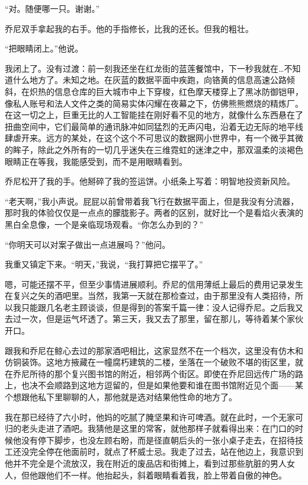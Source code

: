 \documentclass[AutoFakeBold=true]{book}
\begin{document}
``对。随便哪一只。谢谢。''

乔尼双手拿起我的右手。他的手指修长，比我的还长。但我的粗壮。

``把眼睛闭上。''他说。

我闭上了。没有过渡：前一刻我还坐在红龙街的蓝莲餐馆中，下一秒我就在…不知道什么地方了。未知之地。在灰蓝的数据平面中疾跑，向铬黄的信息高速公路倾斜，在炽热的信息仓库的巨大城市中上下穿梭，红色摩天楼穿上了黑冰防御铠甲，像私人账号和法人文件之类的简易实体闪耀在夜幕之下，仿佛熊熊燃烧的精炼厂。在这一切之上，巨重无比的人工智能挂在刚好看不见的地方，就像什么东西悬在了扭曲空间中，它们最简单的通讯脉冲如同猛烈的无声闪电，沿着无边无际的地平线肆虐开来。远方的某处，在这个这个不可思议的数据网小世界中，有一个微乎其微的眸子，除此之外所有的一切几乎迷失在三维霓虹的迷津之中，那双温柔的淡褐色眼睛正在等我，我能感受到，而不是用眼睛看到。

乔尼松开了我的手。他掰碎了我的签运饼。小纸条上写着：明智地投资新风险。

``老天啊，''我小声说。屁屁以前曾带着我飞行在数据平面上，但是我没有分流器，那时我的体验仅仅是一点点的朦胧影子。两者的区别，就好比一个是看焰火表演的黑白全息像，一个是亲临现场观看。``你怎么办到的？''

``你明天可以对案子做出一点进展吗？''他问。

我重又镇定下来。``明天，''我说，``我打算把它摆平了。''

\vspace*{1em}

嗯，可能还摆不平，但至少事情进展顺利。乔尼的信用薄纸上最后的费用记录发生在复兴之矢的酒吧里。当然，我第一天就在那检查过，由于那里没有人类招待，所以我只能跟几名老主顾谈谈，但是得到的答案千篇一律：没人记得乔尼。之后我又去过一次，但是运气坏透了。第三天，我又去了那里，留在那儿，等待着某个家伙开口。

跟我和乔尼在鲸心去过的那家酒吧相比，这家显然不在一个档次，这里没有仿木和仿铜装饰。这地方掖藏在一幢腐朽建筑的二楼，坐落在一个破败不堪的街区里，就在乔尼所待的那个复兴图书馆的附近，相邻两个街区。即使在乔尼回远传广场的路上，也决不会顺路到这地方逗留的，但是如果他要和谁在图书馆附近见个面——某个想跟他私下里聊聊的人，那他就是选对结果他性命的地方了。

我在那已经待了六小时，他妈的吃腻了腌坚果和许可啤酒。就在此时，一个无家可归的老头走进了酒吧。我猜他是这里的常客，就他那样子就看得出来：在门口的时候他没有停下脚步，也没左顾右盼，而是径直朝后头的一张小桌子走去，在招待技工还没完全停在他面前时，就点了杯威士忌。我走了过去，站在他边上，我意识到他并不完全是个流放汉，我在附近的废品店和街摊上，看到过那些肮脏的男人女人，但他跟他们不一样。他抬起头，斜着眼睛看着我，脸上带着自傲的神色。
\end{document}
